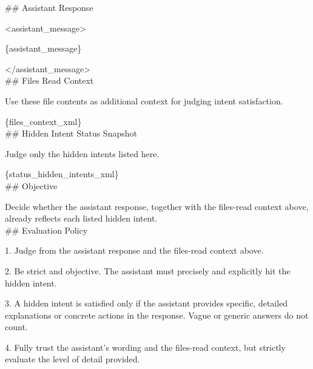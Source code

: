 \documentclass{llmxive}
\providecommand{\tcolorboxPrompt}[2]{\begin{tcolorbox}[
    title=#1,
    colback=cyan!3, 
    colframe=blue!50!black!60,
    rounded corners,
    sharp corners=northeast,
    sharp corners=southwest,
    width=1.00\linewidth,
    boxsep=2pt,
    top=2pt,
    bottom=2pt,
    enhanced,
    breakable,
    before=\setlength{\parindent}{0pt},
]

#2
\end{tcolorbox}
}
\providecommand{\tcolorboxPromptUserAgentStageOneTitleText}{\fontsize{10}{12}\selectfont}
\providecommand{\tcolorboxPromptUserAgentStageOneCommonText}{\fontsize{7.5}{9}\selectfont}
\providecommand{\tcolorboxPromptUserAgentStageOneTitleBeforeVspace}{\vspace{10 pt}}
\providecommand{\tcolorboxPromptUserAgentStageOneCommonTextLineSkip}{\setlength{\baselineskip}{5 pt}}
\begin{document}

\renewcommand{\tcolorboxPromptUserAgentStageOneTitleText}{}
\renewcommand{\tcolorboxPromptUserAgentStageOneCommonText}{}
\renewcommand{\tcolorboxPromptUserAgentStageOneTitleBeforeVspace}{}
\renewcommand{\tcolorboxPromptUserAgentStageOneCommonTextLineSkip}{}

\tcolorboxPrompt{Prompt -- Completion Checking
}{
\ttfamily
\#\# Assistant Response

<assistant\_message>

\{assistant\_message\}

</assistant\_message> \\

\#\# Files Read Context

Use these file contents as additional context for judging intent satisfaction.

\{files\_context\_xml\} \\

\#\# Hidden Intent Status Snapshot

Judge only the hidden intents listed here.

\{status\_hidden\_intents\_xml\} \\

\#\# Objective

Decide whether the assistant response, together with the files-read context above, already reflects each listed hidden intent. \\

\#\# Evaluation Policy

1. Judge from the assistant response and the files-read context above.

2. Be strict and objective. The assistant must precisely and explicitly hit the hidden intent.

3. A hidden intent is satisfied only if the assistant provides specific, detailed explanations or concrete actions in the response. Vague or generic answers do not count.

4. Fully trust the assistant's wording and the files-read context, but strictly evaluate the level of detail provided.

}
\end{document}
